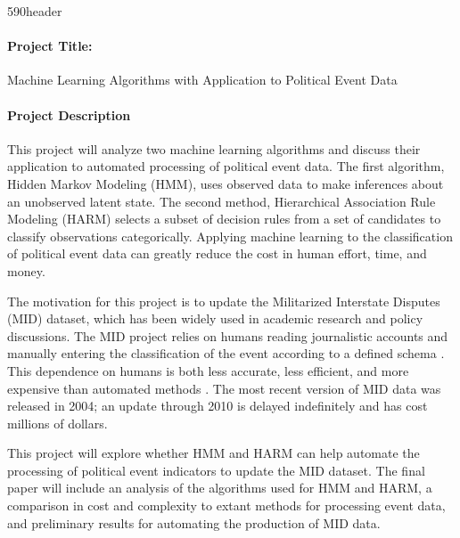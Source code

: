 \documentclass[12pt,letterpaper]{article}
\begin{document}
\cps590header

\paragraph{Project Title:} Machine Learning Algorithms with Application to Political Event Data

\paragraph{Project Description} This project will analyze two machine learning algorithms and discuss their application to automated processing of political event data. The first algorithm, Hidden Markov Modeling (HMM), uses observed data to make inferences about an unobserved latent state. The second method, Hierarchical Association Rule Modeling (HARM) selects a subset of decision rules from a set of candidates to classify observations categorically. Applying machine learning to the classification of political event data can greatly reduce the cost in human effort, time, and money. 

The motivation for this project is to update the Militarized Interstate Disputes (MID) dataset, which has been widely used in academic research and policy discussions. The MID project relies on humans reading journalistic accounts and manually entering the classification of the event according to a defined schema \citep{gerner1994, grimmer2013}. This dependence on humans is both less accurate, less efficient, and more expensive than automated methods \citep{king2003automated, mikhaylov2012coder, ruggeri2011events}. The most recent version of MID data was released in 2004; an update through 2010 is delayed indefinitely and has cost millions of dollars.

This project will explore whether HMM and HARM can help automate the processing of political event indicators to update the MID dataset. The final paper will include an analysis of the algorithms used for HMM and HARM, a comparison in cost and complexity to extant methods for processing event data, and preliminary results for automating the production of MID data.



\renewcommand{\bibsection}{\paragraph{References}}
\setlength{\bibsep}{0.0pt}


\end{document}
